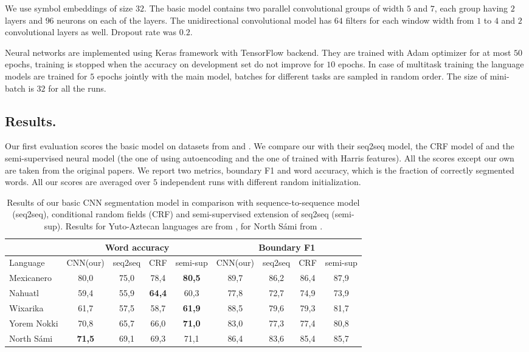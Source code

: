 \documentclass[11pt,a4paper]{article}
\begin{document}
We use symbol embeddings of size $32$. The basic model contains two parallel convolutional groups of width $5$ and $7$, each group having $2$ layers and $96$ neurons on each of the layers. The unidirectional convolutional model has $64$ filters for each window width from $1$ to $4$ and $2$ convolutional layers as well. Dropout rate was $0.2$.

Neural networks are implemented using Keras framework with TensorFlow backend. They are trained with Adam optimizer for at most $50$ epochs, training is stopped when the accuracy on development set do not improve for $10$ epochs. In case of multitask training the language models are trained for $5$ epochs jointly with the main model, batches for different tasks are sampled in random order. The size of mini-batch is $32$ for all the runs.

\subsection{Results.}

Our first evaluation scores the basic model on datasets from  and . We compare our with their seq2seq model, the CRF model of  and the semi-supervised neural model (the one of  using autoencoding and the one of  trained with Harris features). All the scores except our own are taken from the original papers. We report two metrics, boundary F1 and word accuracy, which is the fraction of correctly segmented words. All our scores are averaged over $5$ independent runs with different random initialization.

\begin{table*}[h!]
	\centering
	\begin{tabular}{|l|cccc|cccc|}
		\hline
		& \multicolumn{4}{|c|}{Word accuracy} & \multicolumn{4}{|c|}{Boundary F1} \\
		\hline
		Language & CNN(our) & seq2seq & CRF & semi-sup & CNN(our) & seq2seq & CRF & semi-sup \\
		\hline
		Mexicanero & 80,0 & 75,0 & 78,4 & \textbf{80,5} & 89,7 & 86,2 & 86,4 & 87,9 \\
		Nahuatl & 59,4	& 55,9 & \textbf{64,4} & 60,3 & 77,8 & 72,7 & 74,9 & 73,9 \\
		Wixarika & 61,7 & 57,5 & 58,7 & \textbf{61,9} & 88,5 & 79,6 & 79,3 & 81,7 \\
		Yorem Nokki & 70,8 & 65,7 & 66,0 & \textbf{71,0} & 83,0 & 77,3 & 77,4 & 80,8 \\
		\hline
		North S\'ami & \textbf{71,5} & 69,1 & 69,3 & 71,1 & 86,4 & 83,6 & 85,4 & 85,7 \\
		\hline 
	\end{tabular}
	\caption{Results of our basic CNN segmentation model in comparison with sequence-to-sequence model (seq2seq), conditional random fields (CRF) and semi-supervised extension of seq2seq (semi-sup). Results for Yuto-Aztecan languages are from , for North S\'ami from .}\label{table-res-1}
\end{table*} 
\end{document}
